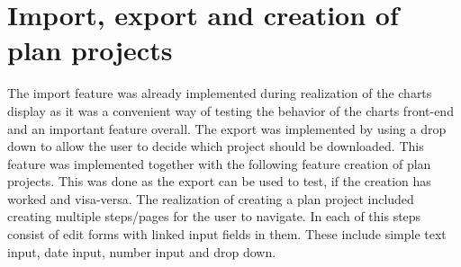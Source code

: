 \section{Import, export and creation of plan projects}
The import feature was already implemented during realization of the charts display as it was a convenient way of testing the behavior of the charts front-end and an important feature overall. The export was implemented by using a drop down to allow the user to decide which project should be downloaded. This feature was implemented together with the following feature creation of plan projects. This was done as the export can be used to test, if the creation has worked and visa-versa. The realization of creating a plan project included creating multiple steps/pages for the user to navigate. In each of this steps consist of edit forms with linked input fields in them. These include simple text input, date input, number input and drop down.